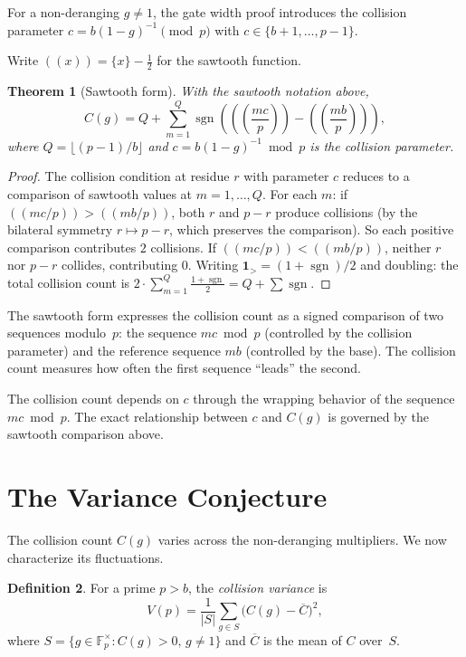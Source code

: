 \documentclass[12pt]{amsart}
\newtheorem{theorem}{Theorem}
\theoremstyle{definition}
\newtheorem{definition}[theorem]{Definition}
\theoremstyle{remark}
\begin{document}
For a non-deranging $g \ne 1$, the gate width proof introduces
the collision parameter $c = b(1{-}g)^{-1} \pmod{p}$ with
$c \in \{b{+}1, \ldots, p{-}1\}$.

Write $\left(\!\left( x \right)\!\right) = \{x\} - \tfrac{1}{2}$
for the sawtooth function.

\begin{theorem}[Sawtooth form]\label{thm:sawtooth}
With the sawtooth notation above,
\[
C(g) = Q + \sum_{m=1}^{Q}
\operatorname{sgn}\!\left(
\left(\!\left(\frac{mc}{p}\right)\!\right) -
\left(\!\left(\frac{mb}{p}\right)\!\right)
\right),
\]
where $Q = \lfloor (p{-}1)/b \rfloor$ and
$c = b(1 - g)^{-1} \bmod p$ is the collision parameter.
\end{theorem}

\begin{proof}
The collision condition at residue $r$ with parameter $c$
reduces to a comparison of sawtooth values at
$m = 1, \ldots, Q$. For each $m$: if
$((mc/p)) > ((mb/p))$, both $r$ and $p - r$ produce
collisions (by the bilateral symmetry $r \mapsto p - r$,
which preserves the comparison). So each positive
comparison contributes $2$ collisions. If
$((mc/p)) < ((mb/p))$, neither $r$ nor $p - r$
collides, contributing $0$. Writing
$\mathbf{1}_{>} = (1 + \operatorname{sgn})/2$ and
doubling: the total collision count is
$2 \cdot \sum_{m=1}^{Q} \frac{1 + \operatorname{sgn}}{2}
= Q + \sum \operatorname{sgn}$.
\end{proof}

The sawtooth form expresses the collision count as a signed
comparison of two sequences modulo~$p$: the sequence $mc \bmod p$
(controlled by the collision parameter) and the reference
sequence $mb$ (controlled by the base). The collision count
measures how often the first sequence ``leads'' the second.

The collision count depends on $c$ through the wrapping
behavior of the sequence $mc \bmod p$. The exact
relationship between $c$ and $C(g)$ is governed by the
sawtooth comparison above.

\section{The Variance Conjecture}

The collision count $C(g)$ varies across the non-deranging
multipliers. We now characterize its fluctuations.

\begin{definition}
For a prime $p > b$, the \emph{collision variance} is
\[
V(p) = \frac{1}{|S|} \sum_{g \in S} \bigl(C(g) -
\overline{C}\bigr)^2,
\]
where $S = \{g \in \mathbb{F}_p^{\times} : C(g) > 0,\,
g \ne 1\}$ and $\overline{C}$ is the mean of $C$ over~$S$.
\end{definition}
\end{document}
